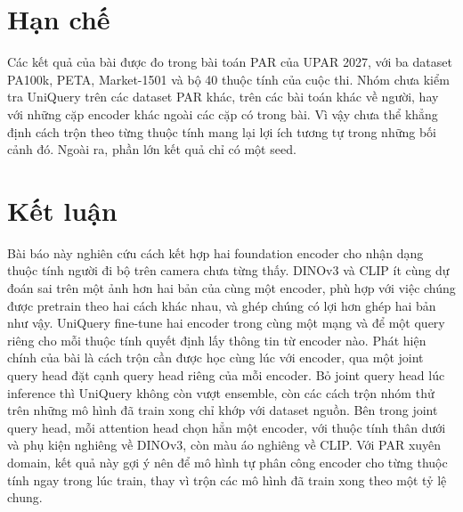 \documentclass[10pt,twocolumn,letterpaper]{article}
\begin{document}
\section{Hạn chế}
\label{sec:limits}

Các kết quả của bài được đo trong bài toán PAR của UPAR 2027, với ba dataset PA100k, PETA, Market-1501 và bộ 40 thuộc tính của cuộc thi. Nhóm chưa kiểm tra UniQuery trên các dataset PAR khác, trên các bài toán khác về người, hay với những cặp encoder khác ngoài các cặp có trong bài. Vì vậy chưa thể khẳng định cách trộn theo từng thuộc tính mang lại lợi ích tương tự trong những bối cảnh đó. Ngoài ra, phần lớn kết quả chỉ có một seed.

\section{Kết luận}
\label{sec:conclusion}

Bài báo này nghiên cứu cách kết hợp hai foundation encoder cho nhận dạng thuộc tính người đi bộ trên camera chưa từng thấy. DINOv3 và CLIP ít cùng dự đoán sai trên một ảnh hơn hai bản của cùng một encoder, phù hợp với việc chúng được pretrain theo hai cách khác nhau, và ghép chúng có lợi hơn ghép hai bản như vậy. UniQuery fine-tune hai encoder trong cùng một mạng và để một query riêng cho mỗi thuộc tính quyết định lấy thông tin từ encoder nào. Phát hiện chính của bài là cách trộn cần được học cùng lúc với encoder, qua một joint query head đặt cạnh query head riêng của mỗi encoder. Bỏ joint query head lúc inference thì UniQuery không còn vượt ensemble, còn các cách trộn nhóm thử trên những mô hình đã train xong chỉ khớp với dataset nguồn. Bên trong joint query head, mỗi attention head chọn hẳn một encoder, với thuộc tính thân dưới và phụ kiện nghiêng về DINOv3, còn màu áo nghiêng về CLIP. Với PAR xuyên domain, kết quả này gợi ý nên để mô hình tự phân công encoder cho từng thuộc tính ngay trong lúc train, thay vì trộn các mô hình đã train xong theo một tỷ lệ chung.

{\small


}
\end{document}
